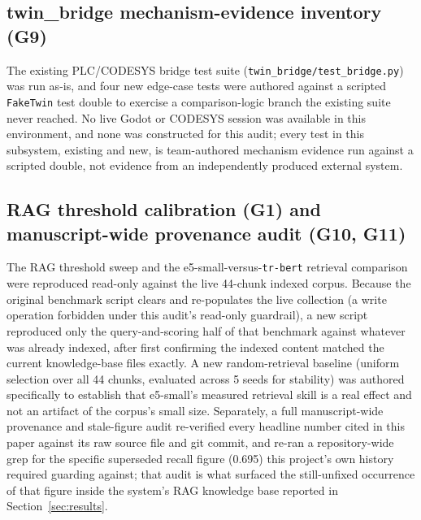 \subsection{twin\_bridge mechanism-evidence inventory (G9)}

The existing PLC/CODESYS bridge test suite (\texttt{twin\_bridge/test\_bridge.py}) was run as-is,
and four new edge-case tests were authored against a scripted \texttt{FakeTwin} test double to
exercise a comparison-logic branch the existing suite never reached. No live Godot or CODESYS
session was available in this environment, and none was constructed for this audit; every test in
this subsystem, existing and new, is team-authored mechanism evidence run against a scripted
double, not evidence from an independently produced external system.

\subsection{RAG threshold calibration (G1) and manuscript-wide provenance audit (G10, G11)}

The RAG threshold sweep and the e5-small-versus-\texttt{tr-bert} retrieval comparison were
reproduced read-only against the live 44-chunk indexed corpus. Because the original benchmark
script clears and re-populates the live collection (a write operation forbidden under this audit's
read-only guardrail), a new script reproduced only the query-and-scoring half of that benchmark
against whatever was already indexed, after first confirming the indexed content matched the
current knowledge-base files exactly. A new random-retrieval baseline (uniform selection over all
44 chunks, evaluated across 5 seeds for stability) was authored specifically to establish that
e5-small's measured retrieval skill is a real effect and not an artifact of the corpus's small
size. Separately, a full manuscript-wide provenance and stale-figure audit re-verified every
headline number cited in this paper against its raw source file and git commit, and re-ran a
repository-wide grep for the specific superseded recall figure (0.695) this project's own history
required guarding against; that audit is what surfaced the still-unfixed occurrence of that figure
inside the system's RAG knowledge base reported in Section~\ref{sec:results}.
